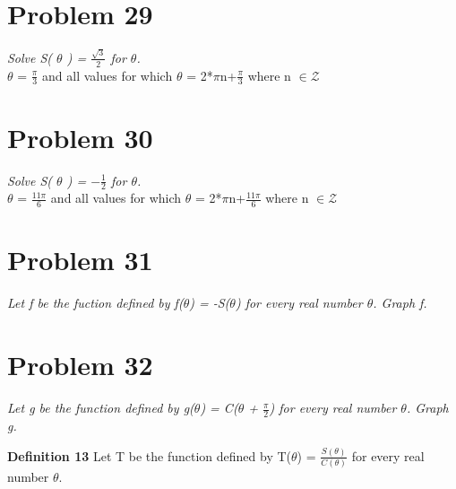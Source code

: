 \documentclass[11pt]{article} %
\newcommand\tab[1][1cm]{\hspace*{#1}}
\begin{document}
{\section{Problem 29} 
\textit{Solve S( $\theta$ ) = $\frac{\sqrt{3}}{2}$ for $\theta$.}
\\ \tab $\theta$ = $\frac{\pi}{3}$ and all values for which $\theta$ = 2*$\pi$n+$\frac{\pi}{3}$ where n $\in \mathcal{Z}$


\section{Problem 30} 
\textit{Solve S( $\theta$ ) = $-\frac{1}{2}$ for $\theta$.}
\\ \tab $\theta$ = $\frac{11\pi}{6}$ and all values for which $\theta$ = 2*$\pi$n+$\frac{11\pi}{6}$ where n $\in \mathcal{Z}$

\section{Problem 31} 
\textit{Let f be the fuction defined by f($\theta$) = -S($\theta$) for every real number $\theta$. Graph f.}
\\

\section{Problem 32} 
\textit{Let g be the function defined by g($\theta$) = C($\theta$ + $\frac{\pi}{2}$) for every real number $\theta$. Graph g.}
\\

\textbf{Definition 13}
Let T be the function defined by T($\theta$) = $\frac{S(\theta)}{C(\theta)}$ for every real number $\theta$.

}
\end{document}
